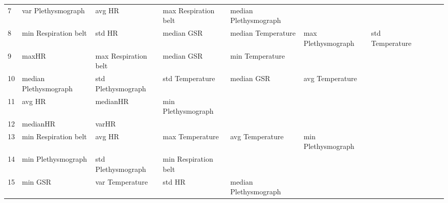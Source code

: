 \begin{landscape}
\begin{table}[]
\begin{tabular}{l|llllllll}
7        & var Plethysmograph      & avg HR                  & max Respiration belt    & median Plethysmograph   &                         &                       &                         &                         &                         &         \\
8        & min Respiration belt    & std HR                  & median GSR              & median Temperature      & max Plethysmograph      & std Temperature       &                         &                         &                         &         \\
9        & maxHR                   & max Respiration belt    & median GSR              & min Temperature         &                         &                       &                         &                         &                         &         \\
10       & median Plethysmograph   & std Plethysmograph      & std Temperature         & median GSR              & avg Temperature         &                       &                         &                         &                         &         \\
11       & avg HR                  & medianHR                & min Plethysmograph      &                         &                         &                       &                         &                         &                         &         \\
12       & medianHR                & varHR                   &                         &                         &                         &                       &                         &                         &                         &         \\
13       & min Respiration belt    & avg HR                  & max Temperature         & avg Temperature         & min Plethysmograph      &                       &                         &                         &                         &         \\
14       & min Plethysmograph      & std Plethysmograph      & min Respiration belt    &                         &                         &                       &                         &                         &                         &         \\
15       & min GSR                 & var Temperature         & std HR                  & median Plethysmograph   &                         &                       &                         &                         &                         &         \\

\end{tabular}
\end{table}
\end{landscape}
